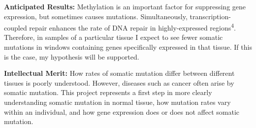 \documentclass[12pt]{article}
\begin{document}

\textbf{Anticipated Results:}
Methylation is an important factor for suppressing gene expression, but sometimes causes mutations.
Simultaneously, transcription-coupled repair enhances the rate of DNA repair in highly-expressed regions\textsuperscript{4}.
Therefore, in samples of a particular tissue I expect to see fewer somatic mutations in windows containing genes specifically expressed in that tissue.
If this is the case, my hypothesis will be supported.

\textbf{Intellectual Merit:}
How rates of somatic mutation differ between different tissues is poorly understood.
However, diseases such as cancer often arise by somatic mutation.
This project represents a first step in more clearly understanding somatic mutation in normal tissue, how mutation rates vary within an individual, and how gene expression does or does not affect somatic mutation.
\end{document}
